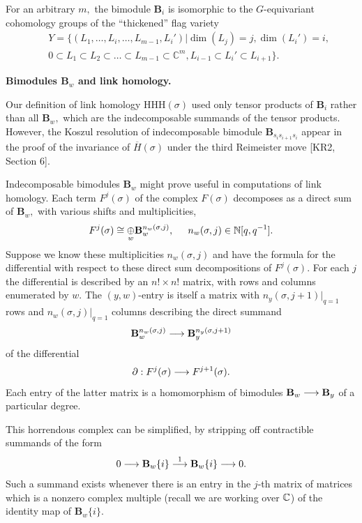 \documentclass[12pt]{article}
\newcommand{\oplusop}[1]{{\mathop{\oplus}\limits_{#1}}}
\begin{document}
\vspace{0.1in} 

For an arbitrary $m,$ the bimodule $\mathbf{B}_i$ is isomorphic to 
the $G$-equivariant cohomology groups of the ``thickened'' 
flag variety 
\begin{eqnarray*} 
& & Y=\{ (L_1, \dots, L_i, \dots , L_{m-1}, L_i') |  
\dim(L_j)=j, \dim(L_i')=i,  \\
& & 0 \subset L_1 \subset L_2 \subset \dots 
\subset L_{m-1}\subset \mathbb{C}^m, L_{i-1}\subset L_i'\subset L_{i+1}
  \}.
 \end{eqnarray*}  


\vspace{0.2in} 

{\bf Bimodules $\mathbf{B}_w$ and link homology.} 

\noindent 
Our definition of link homology $\mathrm{HHH}(\sigma)$ used 
only tensor products of $\mathbf{B}_i$ rather than all $\mathbf{B}_w,$ 
which are the indecomposable summands of the tensor products. 
However, the Koszul resolution of indecomposable bimodule
$\mathbf{B}_{s_i s_{i+1}s_i}$ appear in  
the proof of the invariance of $\overline{H}(\sigma)$ under the 
third Reimeister move [KR2, Section 6]. 

Indecomposable bimodules $\mathbf{B}_w$ might prove useful in 
computations of link homology. Each term $F^j(\sigma)$ of the 
complex $F(\sigma)$ decomposes as a
direct sum of $\mathbf{B}_w,$ with various shifts and multiplicities, 
$$ F^j(\sigma) \cong \oplusop{w} \mathbf{B}_w^{n_w(\sigma,j)}, 
 \hspace{0.2in} n_w(\sigma,j) \in \N[q,q^{-1}].$$ 
Suppose we know these multiplicities $n_w(\sigma,j)$ and have 
the formula for the differential with respect to these direct sum 
 decompositions of $F^j(\sigma).$ For each $j$ the differential is described by 
an $n!\times n!$ matrix, with rows and columns enumerated by $w.$ 
The $(y,w)$-entry is itself a matrix with $n_y(\sigma,j+1)|_{q=1}$ rows 
and $n_w(\sigma,j)|_{q=1}$ columns describing the direct summand 
$$ \mathbf{B}_w^{n_w(\sigma,j)} \longrightarrow 
    \mathbf{B}_y^{n_y(\sigma,j+1)}$$
of the differential 
$$ \partial : F^j(\sigma) \longrightarrow F^{j+1}(\sigma).$$  
Each entry of the latter matrix is a homomorphism of bimodules 
$\mathbf{B}_w \longrightarrow \mathbf{B}_y$ of a particular degree. 

This horrendous complex can be simplified, by stripping off 
contractible summands of the form 
 $$ 0 \longrightarrow \mathbf{B}_w\{i\} \stackrel{1}{\longrightarrow} \mathbf{B}_w\{i\} 
   \longrightarrow 0.$$ 
Such a summand exists whenever there is an entry in the 
$j$-th matrix of matrices which is a nonzero complex multiple (recall we 
are working over $\mathbb C$) of the identity map 
of $\mathbf{B}_w\{i\}.$ 
\end{document}
